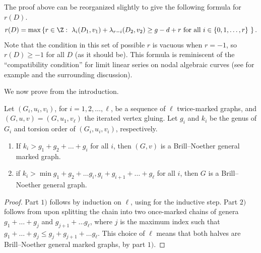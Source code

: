 \begin{rema}
The proof above can be reorganized slightly to give the following formula for $r(D)$.
$$
r(D) = \operatorname{max} \left\{ r \in \Z:\ 
\lambda_i(D_1,v_1) + \lambda_{r-i}(D_2,v_2) \geq g-d+r
\mbox{ for all $i \in \{0,1,\ldots,r\}$ }
\right\}.
$$
Note that the condition in this set of possible $r$ is vacuous when $r = -1$, so $r(D) \geq -1$ for all $D$ (as it should be).
This formula is reminiscent of the ``compatibility condition'' for limit linear series on nodal algebraic curves (see for example \cite[Definition 5.33]{HarrisMorrison} and the surrounding discussion).
\end{rema}



We now prove  from the introduction.

\begin{coro}
Let $(G_i, u_i, v_i)$, for $i=1,2, \ldots, \ell$, be a sequence of $\ell$ twice-marked graphs, and $(G,u,v) = (G,u_1, v_\ell)$ the iterated vertex gluing. Let $g_i$ and $k_i$ be the genus of $G_i$ and torsion order of $(G_i, u_i, v_i)$, respectively. 
\begin{enumerate}[label = \arabic*)]
    \item If $k_i > g_1 + g_2 + \ldots + g_i$ for all $i$, then $(G,v)$ is a Brill--Noether general marked graph.
    \item if $k_i > \min{g_1 + g_2 + \ldots g_i, g_i + g_{i+1} + \ldots + g_\ell }$ for all $i$, then $G$ is a Brill--Noether general graph.
\end{enumerate}
\end{coro}

\begin{proof}
Part $1)$ follows by induction on $\ell$, using  for the inductive step. Part $2)$ follows from  upon splitting the chain into two once-marked chains of genera $g_1 + \ldots + g_j$ and $g_{j+1} + \ldots g_\ell$, where $j$ is the maximum index such that $g_1 + \ldots + g_j \leq g_{j} + g_{j+1} + \ldots g_\ell$.  This choice of $\ell$ means that both halves are Brill--Noether general marked graphs, by part $1)$.
\end{proof}

